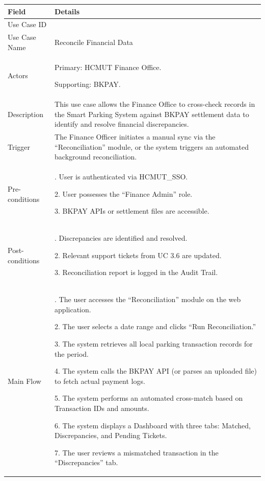 \begin{table}[H]
\small
\renewcommand{\arraystretch}{1.4}
\begin{tabularx}{\textwidth}{|>{\raggedright\arraybackslash}p{3.5cm}|>{\RaggedRight\arraybackslash}X|}
\hline
\rowcolor{gray!20} \textbf{Field} & \textbf{Details} \\
\hline
Use Case ID & 3.7 \\
\hline
Use Case Name & Reconcile Financial Data \\
\hline
Actors & Primary: HCMUT Finance Office. \par Supporting: BKPAY. \\
\hline
Description & This use case allows the Finance Office to cross-check records in the Smart Parking System against BKPAY settlement data to identify and resolve financial discrepancies. \\
\hline
Trigger & The Finance Officer initiates a manual sync via the ``Reconciliation'' module, or the system triggers an automated background reconciliation. \\
\hline
Pre-conditions & 1. User is authenticated via HCMUT\_SSO. \par 2. User possesses the ``Finance Admin'' role. \par 3. BKPAY APIs or settlement files are accessible. \\
\hline
Post-conditions & 1. Discrepancies are identified and resolved. \par 2. Relevant support tickets from UC 3.6 are updated. \par 3. Reconciliation report is logged in the Audit Trail. \\
\hline
Main Flow & 
1. The user accesses the ``Reconciliation'' module on the web application. \par
2. The user selects a date range and clicks ``Run Reconciliation.'' \par
3. The system retrieves all local parking transaction records for the period. \par
4. The system calls the BKPAY API (or parses an uploaded file) to fetch actual payment logs. \par
5. The system performs an automated cross-match based on Transaction IDs and amounts. \par
6. The system displays a Dashboard with three tabs: Matched, Discrepancies, and Pending Tickets. \par
7. The user reviews a mismatched transaction in the ``Discrepancies'' tab. \par

\end{tabularx}
\end{table}

